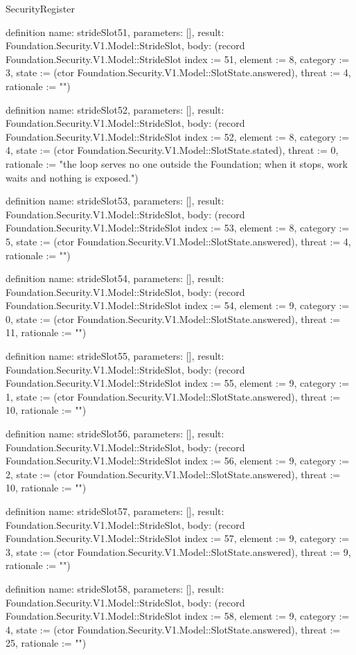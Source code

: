 \begin{lexlean}{SecurityRegister}
\begin{semanticmodule}
definition{
  name: strideSlot51,
  parameters: [],
  result: Foundation.Security.V1.Model::StrideSlot,
  body: (record Foundation.Security.V1.Model::StrideSlot {index := 51, element := 8, category := 3, state := (ctor Foundation.Security.V1.Model::SlotState.answered), threat := 4, rationale := ""})
}

definition{
  name: strideSlot52,
  parameters: [],
  result: Foundation.Security.V1.Model::StrideSlot,
  body: (record Foundation.Security.V1.Model::StrideSlot {index := 52, element := 8, category := 4, state := (ctor Foundation.Security.V1.Model::SlotState.stated), threat := 0, rationale := "the loop serves no one outside the Foundation; when it stops, work waits and nothing is exposed."})
}

definition{
  name: strideSlot53,
  parameters: [],
  result: Foundation.Security.V1.Model::StrideSlot,
  body: (record Foundation.Security.V1.Model::StrideSlot {index := 53, element := 8, category := 5, state := (ctor Foundation.Security.V1.Model::SlotState.answered), threat := 4, rationale := ""})
}

definition{
  name: strideSlot54,
  parameters: [],
  result: Foundation.Security.V1.Model::StrideSlot,
  body: (record Foundation.Security.V1.Model::StrideSlot {index := 54, element := 9, category := 0, state := (ctor Foundation.Security.V1.Model::SlotState.answered), threat := 11, rationale := ""})
}

definition{
  name: strideSlot55,
  parameters: [],
  result: Foundation.Security.V1.Model::StrideSlot,
  body: (record Foundation.Security.V1.Model::StrideSlot {index := 55, element := 9, category := 1, state := (ctor Foundation.Security.V1.Model::SlotState.answered), threat := 10, rationale := ""})
}

definition{
  name: strideSlot56,
  parameters: [],
  result: Foundation.Security.V1.Model::StrideSlot,
  body: (record Foundation.Security.V1.Model::StrideSlot {index := 56, element := 9, category := 2, state := (ctor Foundation.Security.V1.Model::SlotState.answered), threat := 10, rationale := ""})
}

definition{
  name: strideSlot57,
  parameters: [],
  result: Foundation.Security.V1.Model::StrideSlot,
  body: (record Foundation.Security.V1.Model::StrideSlot {index := 57, element := 9, category := 3, state := (ctor Foundation.Security.V1.Model::SlotState.answered), threat := 9, rationale := ""})
}

definition{
  name: strideSlot58,
  parameters: [],
  result: Foundation.Security.V1.Model::StrideSlot,
  body: (record Foundation.Security.V1.Model::StrideSlot {index := 58, element := 9, category := 4, state := (ctor Foundation.Security.V1.Model::SlotState.answered), threat := 25, rationale := ""})
}


\end{semanticmodule}
\end{lexlean}
